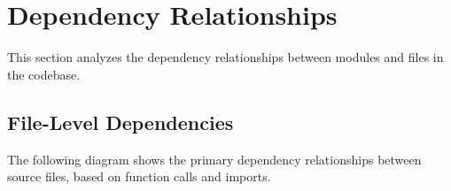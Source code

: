 
\section{Dependency Relationships}
\label{sec:dependencies}

This section analyzes the dependency relationships between modules and files in the \ctx{} codebase.

\subsection{File-Level Dependencies}

The following diagram shows the primary dependency relationships between source files, based on function calls and imports.

